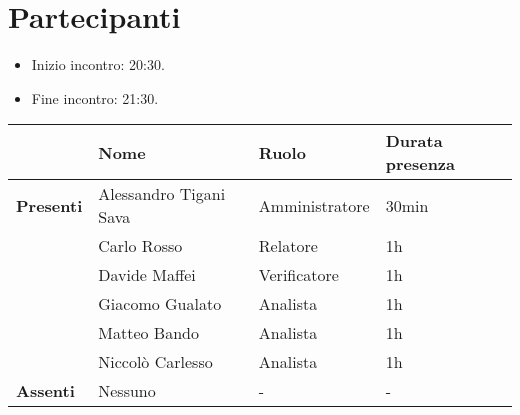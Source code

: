 \section*{Partecipanti}

\begin{itemize}
	\item Inizio incontro: 20:30.
	\item Fine incontro: 21:30.
\end{itemize}


\begin{center}
	\begin{tabular}{llll}
		                  & \textbf{Nome}          & \textbf{Ruolo} & \textbf{Durata presenza} \\
		\hline
		\textbf{Presenti} & Alessandro Tigani Sava & Amministratore & 30min                    \\
		                  & Carlo Rosso            & Relatore       & 1h                       \\
		                  & Davide Maffei          & Verificatore   & 1h                       \\
		                  & Giacomo Gualato        & Analista       & 1h                       \\
		                  & Matteo Bando           & Analista       & 1h                       \\
		                  & Niccolò Carlesso       & Analista       & 1h                       \\
		\hline
		\textbf{Assenti}  & Nessuno                & -              & -                        \\
	\end{tabular}
\end{center}
